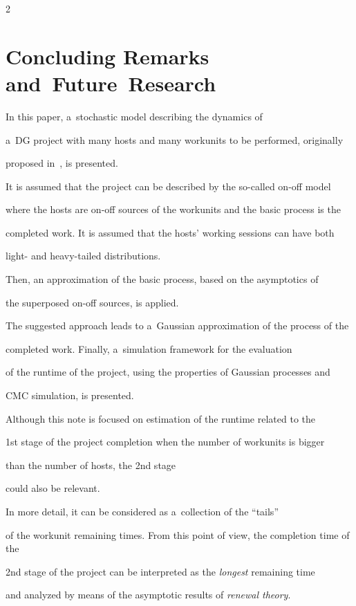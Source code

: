\begin{multicols}{2}
\section{Concluding Remarks and~Future~Research}



\noindent

 In this paper,   a~stochastic model describing the dynamics of 

 a~DG project with many hosts and many work\-units to be performed, originally

 proposed in~\cite{1-luk-1},  is presented. 

 It is assumed that the project  can be   described by the so-called on-off model 

 where the hosts are on-off  sources of the work\-units  and the basic process is the 

 completed work. It is assumed that  the hosts' working sessions can have both 

  light- and heavy-tailed distributions.

 Then, an approximation of the  basic process, based on  the asymptotics of 

 the superposed on-off sources, is applied.    

 The suggested approach   leads to a~Gaussian approximation of the process of the 

 completed work. Finally,  a~simulation framework for the evaluation 

 of the runtime of the project, using the properties of Gaussian processes and 

 CMC simulation, is presented. 



Although  this note is focused on estimation of the runtime related to the 

1st stage of the project completion when the number of workunits is bigger 

than the number of hosts,  the 2nd  stage 

could also be relevant.

In more detail, it can be considered as a~collection of the ``tails''  

of the  workunit remaining times. From this point of view, the completion time of the 

2nd stage of the project  can be interpreted as  the \textit{longest} remaining time 

and analyzed by means of the asymptotic results of \textit{renewal theory}.


\end{multicols}
